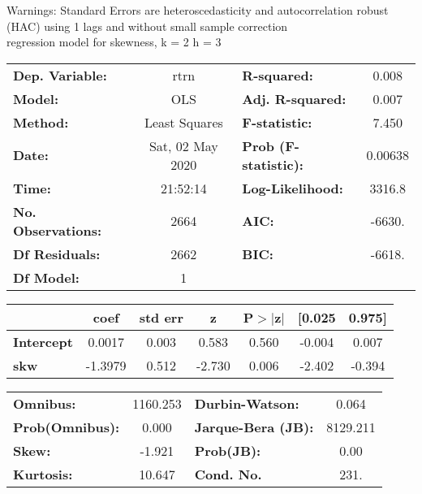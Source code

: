 Warnings: \newline
 [1] Standard Errors are heteroscedasticity and autocorrelation robust (HAC) using 1 lags and without small sample correction\\ 

regression model for skewness, k = 2 h = 3\begin{center}
\begin{tabular}{lclc}
\toprule
\textbf{Dep. Variable:}    &       rtrn       & \textbf{  R-squared:         } &     0.008   \\
\textbf{Model:}            &       OLS        & \textbf{  Adj. R-squared:    } &     0.007   \\
\textbf{Method:}           &  Least Squares   & \textbf{  F-statistic:       } &     7.450   \\
\textbf{Date:}             & Sat, 02 May 2020 & \textbf{  Prob (F-statistic):} &  0.00638    \\
\textbf{Time:}             &     21:52:14     & \textbf{  Log-Likelihood:    } &    3316.8   \\
\textbf{No. Observations:} &        2664      & \textbf{  AIC:               } &    -6630.   \\
\textbf{Df Residuals:}     &        2662      & \textbf{  BIC:               } &    -6618.   \\
\textbf{Df Model:}         &           1      & \textbf{                     } &             \\
\bottomrule
\end{tabular}
\begin{tabular}{lcccccc}
                   & \textbf{coef} & \textbf{std err} & \textbf{z} & \textbf{P$> |$z$|$} & \textbf{[0.025} & \textbf{0.975]}  \\
\midrule
\textbf{Intercept} &       0.0017  &        0.003     &     0.583  &         0.560        &       -0.004    &        0.007     \\
\textbf{skw}       &      -1.3979  &        0.512     &    -2.730  &         0.006        &       -2.402    &       -0.394     \\
\bottomrule
\end{tabular}
\begin{tabular}{lclc}
\textbf{Omnibus:}       & 1160.253 & \textbf{  Durbin-Watson:     } &    0.064  \\
\textbf{Prob(Omnibus):} &   0.000  & \textbf{  Jarque-Bera (JB):  } & 8129.211  \\
\textbf{Skew:}          &  -1.921  & \textbf{  Prob(JB):          } &     0.00  \\
\textbf{Kurtosis:}      &  10.647  & \textbf{  Cond. No.          } &     231.  \\
\bottomrule
\end{tabular}
\end{center}

